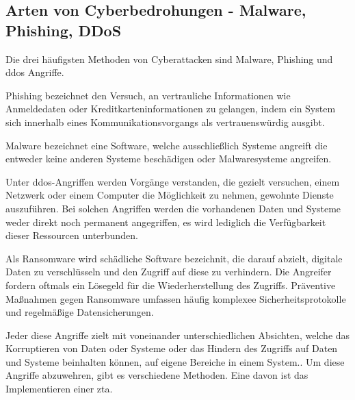 \subsection[Arten von Cyberbedrohungen]{Arten von Cyberbedrohungen - Malware, Phishing, DDoS}\label{subsec:arten-von-cyberbedrohungen---malware-phishing-ddos}

Die drei häufigsten Methoden von Cyberattacken sind Malware, Phishing und \ac{ddos} Angriffe.

\begin{definition}
    \label{def:phishing}
    Phishing bezeichnet den Versuch, an vertrauliche Informationen wie Anmeldedaten oder Kreditkarteninformationen zu gelangen, indem ein System sich innerhalb eines Kommunikationsvorgangs als vertrauenswürdig ausgibt.\autocite[\vglf][]{study-on-phishing-attacks:2018}
\end{definition}

\begin{definition}
    \label{def:malware}
    Malware bezeichnet eine Software, welche ausschließlich Systeme angreift die entweder keine anderen Systeme beschädigen oder Malwaresysteme angreifen.\autocite[\vglf][\pagef 108f.]{definition-malware-2010}
\end{definition}

\begin{definition}
    \label{def:ddos}
    Unter \ac{ddos}-Angriffen werden Vorgänge verstanden, die gezielt versuchen, einem Netzwerk oder einem Computer die Möglichkeit zu nehmen, gewohnte Dienste auszuführen.
    Bei solchen Angriffen werden die vorhandenen Daten und Systeme weder direkt noch permanent angegriffen, es wird lediglich die Verfügbarkeit dieser Ressourcen unterbunden.\autocite[\vglf][]{ddos-definition-2003}
\end{definition}

\begin{definition}
    \label{def:ransomware}
    Als Ransomware wird schädliche Software bezeichnit, die darauf abzielt, digitale Daten zu verschlüsseln und den Zugriff auf diese zu verhindern.
    Die Angreifer fordern oftmals ein Lösegeld für die Wiederherstellung des Zugriffs.
    Präventive Maßnahmen gegen Ransomware umfassen häufig komplexee Sicherheitsprotokolle und regelmäßige Datensicherungen.
\end{definition}

Jeder diese Angriffe zielt mit voneinander unterschiedlichen Absichten, welche das Korruptieren von Daten oder Systeme oder das Hindern des Zugriffs auf Daten und Systeme beinhalten können, auf eigene Bereiche in einem System..
Um diese Angriffe abzuwehren, gibt es verschiedene Methoden.
Eine davon ist das Implementieren einer \ac{zta}.

